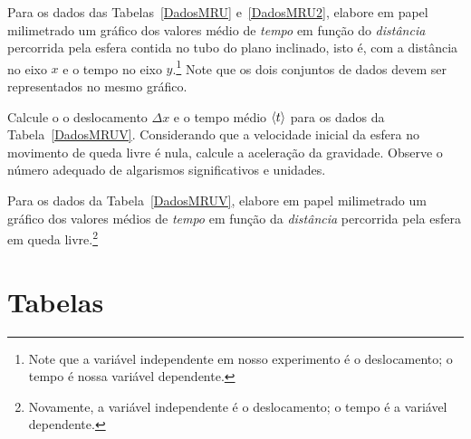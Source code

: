 \begin{question}[type={exam}]{2}
Para os dados das Tabelas~\ref{DadosMRU} e~\ref{DadosMRU2}, elabore em papel milimetrado um gráfico dos valores médio de \emph{tempo} em função do \emph{distância} percorrida pela esfera contida no tubo do plano inclinado, isto é, com a distância no eixo $x$ e o tempo no eixo $y$.\footnote{Note que a variável independente em nosso experimento é o deslocamento; o tempo é nossa variável dependente.} Note que os dois conjuntos de dados devem ser representados no mesmo gráfico.
\end{question}

\begin{question}[type={exam}]{1}
Calcule o o deslocamento $\Delta x$ e o tempo médio $\left\langle{t}\right\rangle$ para os dados da Tabela~\ref{DadosMRUV}. Considerando que a velocidade inicial da esfera no movimento de queda livre é nula, calcule a aceleração da gravidade. Observe o número adequado de algarismos significativos e unidades.
\end{question}

\begin{question}[type={exam}]{2}
Para os dados da Tabela~\ref{DadosMRUV}, elabore em papel milimetrado um gráfico dos valores médios de \emph{tempo} em função da \emph{distância} percorrida pela esfera em queda livre.\footnote{Novamente, a variável independente é o deslocamento; o tempo é a variável dependente.}
\end{question}
\vfill
\pagebreak
\section{Tabelas}

